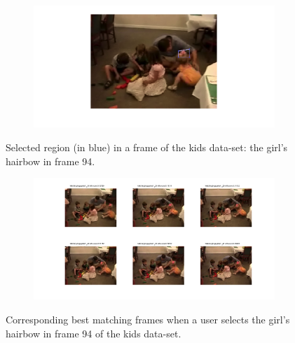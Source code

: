 \documentclass{paper}
\begin{document}
\begin{figure}[!htbp]
\centering
\begin{subfigure}{1.0\textwidth}
\includegraphics[width=\textwidth]{figures/region_queries/kids/selectionRegQ_94}
\end{subfigure}
\caption{Selected region (in blue) in a frame of the kids data-set: the girl's hairbow in frame 94.}
\label{fig:kids_regionquery_sel1}
\end{figure}

\begin{figure}[!htbp]
\centering
\begin{subfigure}{1.0\textwidth}
\includegraphics[width=\textwidth]{figures/region_queries/kids/matchesRegQ_94}
\end{subfigure}
\caption{Corresponding best matching frames when a user selects the girl's hairbow in frame 94 of the kids data-set.}
\label{fig:kids_regionquery_matches1}
\end{figure}
\end{document}

